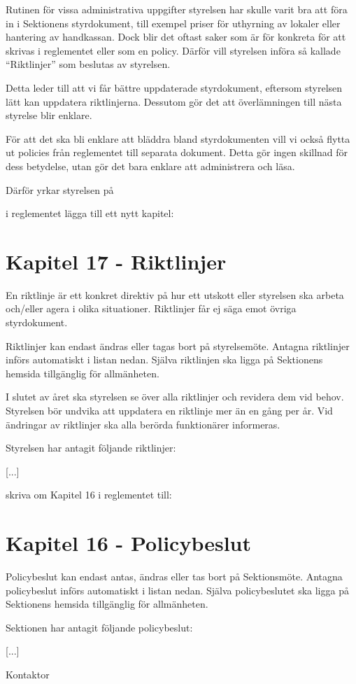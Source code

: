 \documentclass[../_main/handlingar.tex]{subfiles}
\begin{document}

Rutinen för vissa administrativa uppgifter styrelsen har skulle varit bra att föra in i Sektionens styrdokument, till exempel priser för uthyrning av lokaler eller hantering av handkassan. Dock blir det oftast saker som är för konkreta för att skrivas i reglementet eller som en policy. Därför vill styrelsen införa så kallade ``Riktlinjer'' som beslutas av styrelsen.

Detta leder till att vi får bättre uppdaterade styrdokument, eftersom styrelsen lätt kan uppdatera riktlinjerna. Dessutom gör det att överlämningen till nästa styrelse blir enklare.

För att det ska bli enklare att bläddra bland styrdokumenten vill vi också flytta ut policies från reglementet till separata dokument. Detta gör ingen skillnad för dess betydelse, utan gör det bara enklare att administrera och läsa.

Därför yrkar styrelsen på
\begin{attsatser}
    \att i reglementet lägga till ett nytt kapitel:\par
    {\it
    \vspace*{-\baselineskip}
    \section*{Kapitel 17 - Riktlinjer}
    En riktlinje är ett konkret direktiv på hur ett utskott eller styrelsen ska arbeta och/eller agera i olika situationer. Riktlinjer får ej säga emot övriga styrdokument.

    Riktlinjer kan endast ändras eller tagas bort på styrelsemöte. Antagna riktlinjer införs automatiskt i listan nedan. Själva riktlinjen ska ligga på Sektionens hemsida tillgänglig för allmänheten.

   I slutet av året ska styrelsen se över alla riktlinjer och revidera dem vid behov. Styrelsen bör undvika att uppdatera en riktlinje mer än en gång per år. Vid ändringar av riktlinjer ska alla berörda funktionärer informeras.

    Styrelsen har antagit följande riktlinjer:
    \begin{dashlist}
        \item {[...]}
    \end{dashlist}
    }
    \att skriva om Kapitel 16 i reglementet till:\par
    {\it
    \vspace*{-\baselineskip}
    \section*{Kapitel 16 - Policybeslut}
    Policybeslut kan endast antas, ändras eller tas bort på Sektionsmöte. Antagna policybeslut införs automatiskt i listan nedan. Själva policybeslutet ska ligga på Sektionens hemsida tillgänglig för allmänheten.

    Sektionen har antagit följande policybeslut:
    \begin{dashlist}
        \item {[...]}
    \end{dashlist}
    }
\end{attsatser}

\begin{signatures}{1}
    \ist
    \signature{Erik Månsson}{Kontaktor}
\end{signatures}
\end{document}
